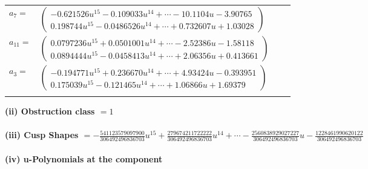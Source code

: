 \documentclass[1p]{elsarticle_modified}
\theoremstyle{definition}
\begin{document}
\begin{tabular}{m{7pt} m{180pt} m{7pt} m{180pt} }
\flushright $a_{7}=$&$\begin{pmatrix}-0.621526 u^{15}-0.109033 u^{14}+\cdots-10.1104 u-3.90765\\0.198744 u^{15}-0.0486526 u^{14}+\cdots+0.732607 u+1.03028\end{pmatrix}$ \\
\flushright $a_{11}=$&$\begin{pmatrix}0.0797236 u^{15}+0.0501001 u^{14}+\cdots-2.52386 u-1.58118\\0.0894444 u^{15}-0.0458413 u^{14}+\cdots+2.06356 u+0.413661\end{pmatrix}$ \\
\flushright $a_{3}=$&$\begin{pmatrix}-0.194771 u^{15}+0.236670 u^{14}+\cdots+4.93424 u-0.393951\\0.175039 u^{15}-0.121465 u^{14}+\cdots+1.06866 u+1.69379\end{pmatrix}$\\&\end{tabular}
\flushleft \textbf{(ii) Obstruction class $= 1$}\\~\\
\flushleft \textbf{(iii) Cusp Shapes $= -\frac{541123579097900}{306492496836703} u^{15}+\frac{279674211722222}{306492496836703} u^{14}+\cdots-\frac{2560838929027227}{306492496836703} u-\frac{1228461990620122}{306492496836703}$}\\~\\
\newpage\renewcommand{\arraystretch}{1}
\flushleft \textbf{(iv) u-Polynomials at the component}\newline \\
\end{document}
